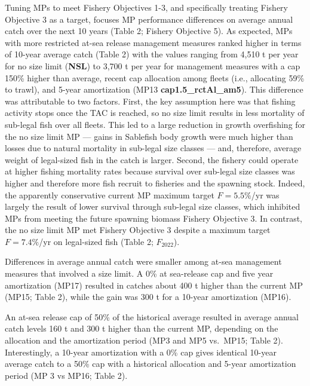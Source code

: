 \documentclass[11pt]{book}
\begin{document}
Tuning MPs to meet Fishery Objectives 1-3, and specifically treating Fishery Objective 3 as a target, focuses MP performance differences on average annual catch over the next 10 years (Table 2; Fishery Objective 5). As expected, MPs with more restricted at-sea release management measures ranked higher in terms of 10-year average catch (Table 2) with the values ranging from 4,510 t per year for no size limit (\textbf{NSL}) to 3,700 t per year for management measures with a cap 150\% higher than average, recent cap allocation among fleets (i.e., allocating 59\% to trawl), and 5-year amortization (MP13 \textbf{cap1.5\_rctAl\_am5}). This difference was attributable to two factors. First, the key assumption here was that fishing activity stops once the TAC is reached, so no size limit results in less mortality of sub-legal fish over all fleets. This led to a large reduction in growth overfishing for the no size limit MP --- gains in Sablefish body growth were much higher than losses due to natural mortality in sub-legal size classes --- and, therefore, average weight of legal-sized fish in the catch is larger. Second, the fishery could operate at higher fishing mortality rates because survival over sub-legal size classes was higher and therefore more fish recruit to fisheries and the spawning stock. Indeed, the apparently conservative current MP maximum target \(F=5.5\%\)/yr was largely the result of lower survival through sub-legal size classes, which inhibited MPs from meeting the future spawning biomass Fishery Objective 3. In contrast, the no size limit MP met Fishery Objective 3 despite a maximum target \(F=7.4\%\)/yr on legal-sized fish (Table 2; \(F_{2022}\)).

Differences in average annual catch were smaller among at-sea management measures that involved a size limit. A 0\% at sea-release cap and five year amortization (MP17) resulted in catches about 400 t higher than the current MP (MP15; Table 2), while the gain was 300 t for a 10-year amortization (MP16).

An at-sea release cap of 50\% of the historical average resulted in average annual catch levels 160 t and 300 t higher than the current MP, depending on the allocation and the amortization period (MP3 and MP5 vs.~MP15; Table 2). Interestingly, a 10-year amortization with a 0\% cap gives identical 10-year average catch to a 50\% cap with a historical allocation and 5-year amortization period (MP 3 vs MP16; Table 2).
\end{document}
